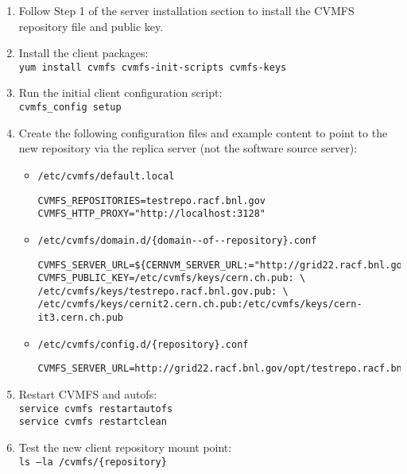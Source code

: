 \documentclass{article}
\begin{document}
\begin{enumerate}
    \item Follow Step 1 of the server installation section to install the CVMFS repository file and public key.

    \item Install the client packages:\\
    \verb+yum install cvmfs cvmfs-init-scripts cvmfs-keys+ 

    \item Run the initial client configuration script:\\
    \verb+cvmfs_config setup+

    \item Create the following configuration files 
    and example content to point to the new repository via the replica server 
    (not the software source server):

    \begin{itemize}

        \item \verb+/etc/cvmfs/default.local+
        \begin{verbatim}
CVMFS_REPOSITORIES=testrepo.racf.bnl.gov
CVMFS_HTTP_PROXY="http://localhost:3128"
        \end{verbatim}

        \item \verb+/etc/cvmfs/domain.d/{domain-­‐of-­‐repository}.conf+
        \begin{verbatim}
CVMFS_SERVER_URL=${CERNVM_SERVER_URL:="http://grid22.racf.bnl.gov/opt/@org@"}
CVMFS_PUBLIC_KEY=/etc/cvmfs/keys/cern.ch.pub: \ 
/etc/cvmfs/keys/testrepo.racf.bnl.gov.pub: \
/etc/cvmfs/keys/cernit2.cern.ch.pub:/etc/cvmfs/keys/cern-it3.cern.ch.pub
        \end{verbatim}

        \item \verb+/etc/cvmfs/config.d/{repository}.conf+
        \begin{verbatim}
CVMFS_SERVER_URL=http://grid22.racf.bnl.gov/opt/testrepo.racf.bnl.gov
        \end{verbatim}
    \end{itemize}

    \item Restart CVMFS and autofs: \\
    \verb+service cvmfs restartautofs+ \\
    \verb+service cvmfs restartclean+ \\

    \item Test the new client repository mount point:\\
    \verb+ls –la /cvmfs/{repository}+

\end{enumerate}
\end{document}
